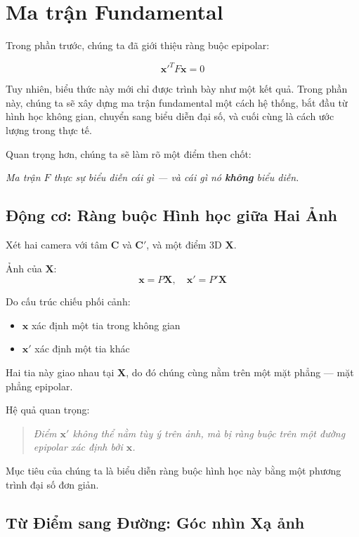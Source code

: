 \section{Ma trận Fundamental}
\label{sec:fundamental_matrix}

Trong phần trước, chúng ta đã giới thiệu ràng buộc epipolar:

\[
\mathbf{x}'^T F \mathbf{x} = 0
\]

Tuy nhiên, biểu thức này mới chỉ được trình bày như một kết quả. Trong phần này, chúng ta sẽ xây dựng ma trận fundamental một cách hệ thống, bắt đầu từ hình học không gian, chuyển sang biểu diễn đại số, và cuối cùng là cách ước lượng trong thực tế.

Quan trọng hơn, chúng ta sẽ làm rõ một điểm then chốt:

\begin{center}
	\textit{Ma trận $F$ thực sự biểu diễn cái gì — và cái gì nó \textbf{không} biểu diễn.}
\end{center}

\subsection{Động cơ: Ràng buộc Hình học giữa Hai Ảnh}
\label{subsec:motivation_F}

Xét hai camera với tâm $\mathbf{C}$ và $\mathbf{C}'$, và một điểm 3D $\mathbf{X}$.

Ảnh của $\mathbf{X}$:
\[
\mathbf{x} = P\mathbf{X}, \quad \mathbf{x}' = P'\mathbf{X}
\]

Do cấu trúc chiếu phối cảnh:
\begin{itemize}
	\item $\mathbf{x}$ xác định một tia trong không gian
	\item $\mathbf{x}'$ xác định một tia khác
\end{itemize}

Hai tia này giao nhau tại $\mathbf{X}$, do đó chúng cùng nằm trên một mặt phẳng — mặt phẳng epipolar.

Hệ quả quan trọng:

\begin{quote}
	\textit{Điểm $\mathbf{x}'$ không thể nằm tùy ý trên ảnh, mà bị ràng buộc trên một đường epipolar xác định bởi $\mathbf{x}$.}
\end{quote}

Mục tiêu của chúng ta là biểu diễn ràng buộc hình học này bằng một phương trình đại số đơn giản.

\subsection{Từ Điểm sang Đường: Góc nhìn Xạ ảnh}
\label{subsec:point_to_line}

